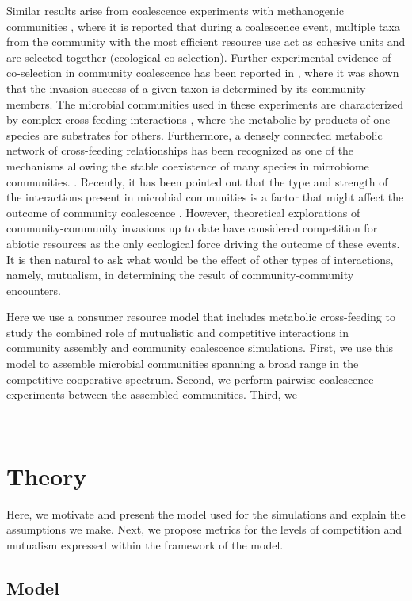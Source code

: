\documentclass[12pt]{article}
\begin{document}
    	Similar results arise from coalescence experiments with methanogenic communities \citep{Sierocinski2017}, where it is reported that during a coalescence event, multiple taxa from the community with the most efficient resource use act as cohesive units and are selected together (ecological co-selection). Further experimental evidence of co-selection in community coalescence has been reported in \citet{Lu2018}, where it was shown that the invasion success of a given taxon is determined by its community members. The microbial communities used in these experiments are characterized by complex cross-feeding interactions \citep{Hansen2007, Lawrence2012, Embree2015}, where the metabolic by-products of one species are substrates for others.
    	Furthermore, a densely connected metabolic network of cross-feeding relationships has been recognized as one of the mechanisms allowing the stable coexistence of many species in microbiome communities. \citep{Goldford2018}. Recently, it has been pointed out that the type and strength of the interactions present in microbial communities is a factor that might affect the outcome of community coalescence \citep{Castledine2020}. However, theoretical explorations of community-community invasions up to date have considered competition for abiotic resources as the only ecological force driving the outcome of these events. It is then natural to ask what would be the  effect of other types of interactions, namely, mutualism, in determining the result of community-community encounters. \par
    	Here we use a consumer resource model that includes metabolic cross-feeding to study the combined role of mutualistic and competitive interactions in community assembly and community coalescence simulations. First, we use this model to assemble microbial communities spanning a broad range in the competitive-cooperative spectrum. Second, we perform pairwise coalescence experiments between the assembled communities. Third, we \par\\
    	
	\section{Theory}
	    Here, we motivate and present the model used for the simulations and explain the assumptions we make. Next, we propose metrics for the levels of competition and mutualism expressed within the framework of the model.
    	\subsection{Model}\label{model}
    	
\end{document}
